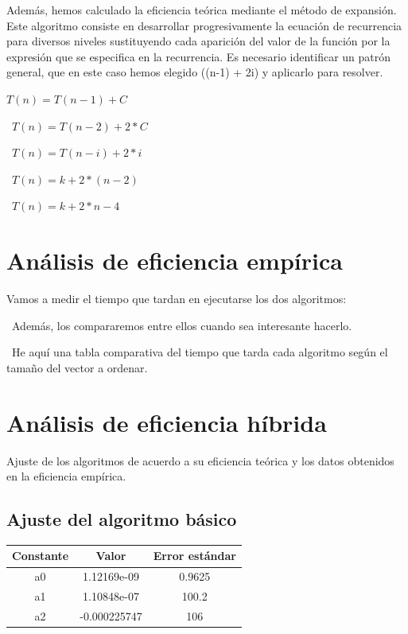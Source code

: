 \documentclass{article}
\begin{document}
	Además, hemos calculado la eficiencia teórica mediante el método de expansión. Este algoritmo consiste en desarrollar progresivamente la ecuación de recurrencia para diversos niveles sustituyendo cada aparición del valor de la función por la expresión que se especifica en la recurrencia. Es necesario identificar un patrón general, que en este caso hemos elegido ((n-1) + 2i) y aplicarlo para resolver.
	

	
	$T(n) = T(n-1) + C$ 
	
	\
	$T(n) = T(n-2) + 2*C$
	
	\
	$T(n) = T(n-i) + 2*i$
	
	\
	$T(n) = k + 2*(n-2)$
	
	\
	$T(n) = k + 2*n - 4$
	
	\section{Análisis de eficiencia empírica}
	Vamos a medir el tiempo que tardan en ejecutarse los dos algoritmos:
	
	\
	Además, los compararemos entre ellos cuando sea interesante hacerlo.
	
	\
	He aquí una tabla comparativa del tiempo que tarda cada algoritmo según el tamaño del vector a ordenar.
	
	
	\section{Análisis de eficiencia híbrida}
	Ajuste de los algoritmos de acuerdo a su eficiencia teórica y los datos obtenidos en la eficiencia empírica.
	
	\subsection{Ajuste del algoritmo básico}
	
	\begin{longtable}{|c|c|c|}
		\hline
		Constante		& Valor			& Error estándar	\\ \hline
		a0              & 1.12169e-09	& 0.9625 \\ \hline
		a1              & 1.10848e-07	& 100.2	 \\ \hline
		a2              & -0.000225747	& 106	 \\ \hline
	\end{longtable}
	
\end{document}
